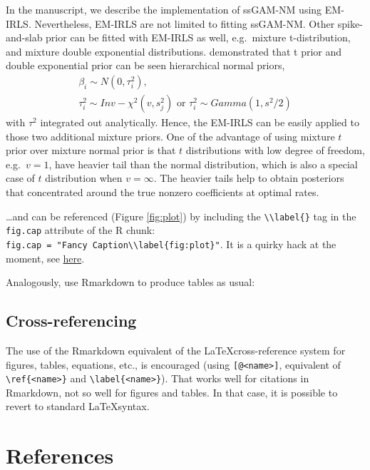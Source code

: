\documentclass[AMA,STIX1COL,]{WileyNJD-v2}
\begin{document}
In the manuscript, we describe the implementation of ssGAM-NM using
EM-IRLS. Nevertheless, EM-IRLS are not limited to fitting ssGAM-NM.
Other spike-and-slab prior can be fitted with EM-IRLS as well,
e.g.~mixture t-distribution, and mixture double exponential
distributions. \citet{Yi2012} demonstrated that t prior and double
exponential prior can be seen hierarchical normal priors, \[
\begin{aligned}
\beta_i \sim N(0, \tau^2_i),\\
\tau^2_i \sim Inv-\chi^2(v, s^2_j) \text{ or } \tau^2_i \sim Gamma(1, s^2/2)
\end{aligned}
\] with \(\tau^2\) integrated out analytically. Hence, the EM-IRLS can
be easily applied to those two additional mixture priors. One of the
advantage of using mixture \(t\) prior over mixture normal prior is that
\(t\) distributions with low degree of freedom, e.g.~\(v=1\), have
heavier tail than the normal distribution, which is also a special case
of \(t\) distribution when \(v=\infty\). The heavier tails help to
obtain posteriors that concentrated around the true nonzero coefficients
at optimal rates. \citep{Rockova2014a}

\ldots and can be referenced (Figure \ref{fig:plot}) by including the
\texttt{\textbackslash{}\textbackslash{}label\{\}} tag in the
\texttt{fig.cap} attribute of the R chunk:
\texttt{fig.cap\ =\ "Fancy\ Caption\textbackslash{}\textbackslash{}label\{fig:plot\}"}.
It is a quirky hack at the moment, see
\href{https://github.com/yihui/knitr/issues/323}{here}.

Analogously, use Rmarkdown to produce tables as usual:

\hypertarget{cross-referencing}{%
\subsection{Cross-referencing}\label{cross-referencing}}

The use of the Rmarkdown equivalent of the \LaTeX cross-reference system
for figures, tables, equations, etc., is encouraged (using
\texttt{{[}@\textless{}name\textgreater{}{]}}, equivalent of
\texttt{\textbackslash{}ref\{\textless{}name\textgreater{}\}} and
\texttt{\textbackslash{}label\{\textless{}name\textgreater{}\}}). That
works well for citations in Rmarkdown, not so well for figures and
tables. In that case, it is possible to revert to standard
\LaTeX syntax.

\hypertarget{references}{%
\section{References}\label{references}}


\end{document}
